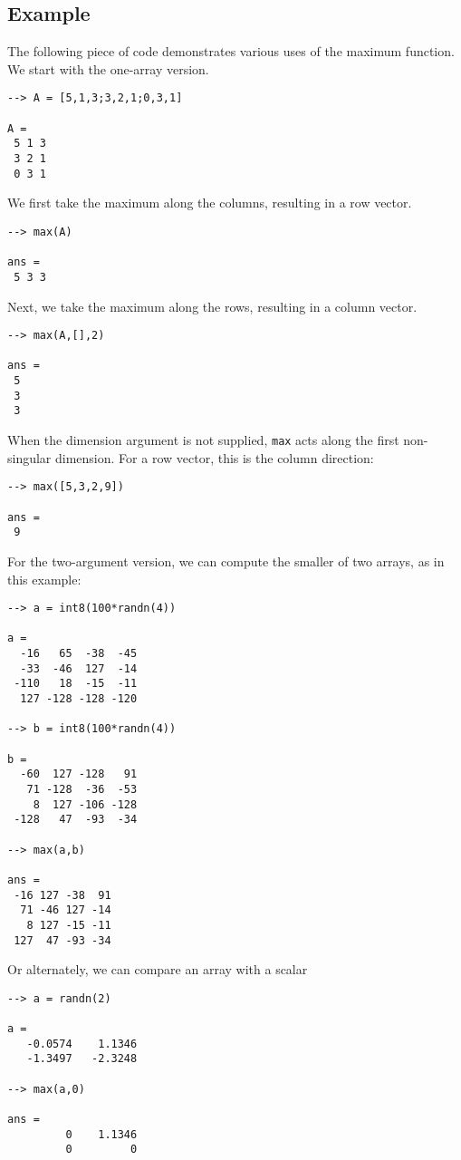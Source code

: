 \subsection{Example}

The following piece of code demonstrates various uses of the maximum
function.  We start with the one-array version.
\begin{verbatim}
--> A = [5,1,3;3,2,1;0,3,1]

A = 
 5 1 3 
 3 2 1 
 0 3 1 
\end{verbatim}
We first take the maximum along the columns, resulting in a row vector.
\begin{verbatim}
--> max(A)

ans = 
 5 3 3 
\end{verbatim}
Next, we take the maximum along the rows, resulting in a column vector.
\begin{verbatim}
--> max(A,[],2)

ans = 
 5 
 3 
 3 
\end{verbatim}
When the dimension argument is not supplied, \verb|max| acts along the first non-singular dimension.  For a row vector, this is the column direction:
\begin{verbatim}
--> max([5,3,2,9])

ans = 
 9 
\end{verbatim}

For the two-argument version, we can compute the smaller of two arrays,
as in this example:
\begin{verbatim}
--> a = int8(100*randn(4))

a = 
  -16   65  -38  -45 
  -33  -46  127  -14 
 -110   18  -15  -11 
  127 -128 -128 -120 

--> b = int8(100*randn(4))

b = 
  -60  127 -128   91 
   71 -128  -36  -53 
    8  127 -106 -128 
 -128   47  -93  -34 

--> max(a,b)

ans = 
 -16 127 -38  91 
  71 -46 127 -14 
   8 127 -15 -11 
 127  47 -93 -34 
\end{verbatim}
Or alternately, we can compare an array with a scalar
\begin{verbatim}
--> a = randn(2)

a = 
   -0.0574    1.1346 
   -1.3497   -2.3248 

--> max(a,0)

ans = 
         0    1.1346 
         0         0 
\end{verbatim}
